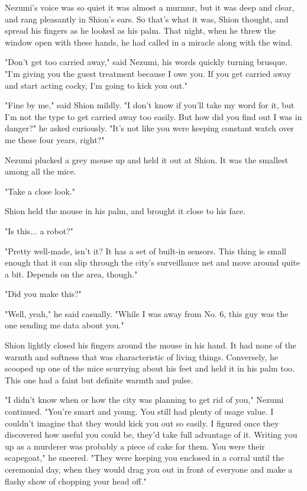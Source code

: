 Nezumi's voice was so quiet it was almost a murmur, but it was deep and
clear, and rang pleasantly in Shion's ears. So that's what it was, Shion
thought, and spread his fingers as he looked as his palm. That night,
when he threw the window open with these hands, he had called in a
miracle along with the wind.

"Don't get too carried away," said Nezumi, his words quickly turning
brusque. "I'm giving you the guest treatment because I owe you. If you
get carried away and start acting cocky, I'm going to kick you out."

"Fine by me," said Shion mildly. "I don't know if you'll take my word
for it, but I'm not the type to get carried away too easily. But how did
you find out I was in danger?" he asked curiously. "It's not like you
were keeping constant watch over me these four years, right?"

Nezumi plucked a grey mouse up and held it out at Shion. It was the
smallest among all the mice.

"Take a close look."

Shion held the mouse in his palm, and brought it close to his face.

"Is this... a robot?"

"Pretty well-made, isn't it? It has a set of built-in sensors. This
thing is small enough that it can slip through the city's surveillance
net and move around quite a bit. Depends on the area, though."

"Did you make this?"

"Well, yeah," he said casually. "While I was away from No. 6, this guy
was the one sending me data about you."

Shion lightly closed his fingers around the mouse in his hand. It had
none of the warmth and softness that was characteristic of living
things. Conversely, he scooped up one of the mice scurrying about his
feet and held it in his palm too. This one had a faint but definite
warmth and pulse.

"I didn't know when or how the city was planning to get rid of you,"
Nezumi continued. "You're smart and young. You still had plenty of usage
value. I couldn't imagine that they would kick you out so easily. I
figured once they discovered how useful you could be, they'd take full
advantage of it. Writing you up as a murderer was probably a piece of
cake for them. You were their scapegoat," he sneered. "They were keeping
you enclosed in a corral until the ceremonial day, when they would drag
you out in front of everyone and make a flashy show of chopping your
head off."

